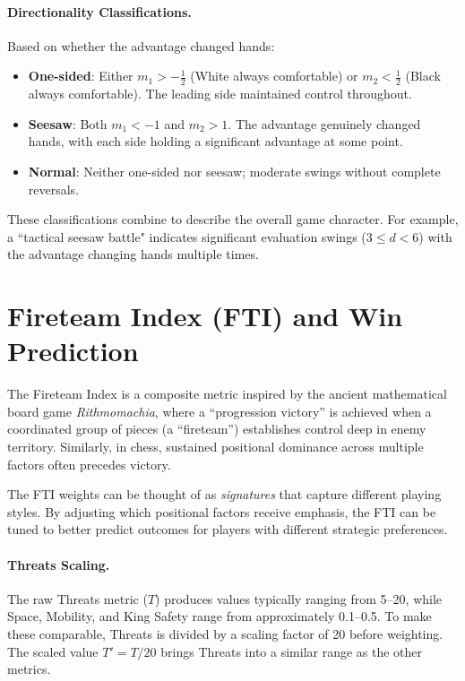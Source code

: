 \documentclass[11pt]{book}
\begin{document}
\paragraph{Directionality Classifications.} Based on whether the advantage changed hands:
\begin{itemize}
\item \textbf{One-sided}: Either $m_1 > -\frac{1}{2}$ (White always comfortable) or $m_2 < \frac{1}{2}$ (Black always comfortable). The leading side maintained control throughout.
\item \textbf{Seesaw}: Both $m_1 < -1$ and $m_2 > 1$. The advantage genuinely changed hands, with each side holding a significant advantage at some point.
\item \textbf{Normal}: Neither one-sided nor seesaw; moderate swings without complete reversals.
\end{itemize}

These classifications combine to describe the overall game character. For example, a ``tactical seesaw battle" indicates significant evaluation swings ($3 \le d < 6$) with the advantage changing hands multiple times.

\section{Fireteam Index (FTI) and Win Prediction}

The Fireteam Index is a composite metric inspired by the ancient mathematical board game \textit{Rithmomachia}, where a ``progression victory'' is achieved when a coordinated group of pieces (a ``fireteam'') establishes control deep in enemy territory. Similarly, in chess, sustained positional dominance across multiple factors often precedes victory.

The FTI weights can be thought of as \emph{signatures} that capture different playing styles. By adjusting which positional factors receive emphasis, the FTI can be tuned to better predict outcomes for players with different strategic preferences.

\paragraph{Threats Scaling.} The raw Threats metric ($T$) produces values typically ranging from 5--20, while Space, Mobility, and King Safety range from approximately 0.1--0.5. To make these comparable, Threats is divided by a scaling factor of 20 before weighting. The scaled value $T' = T/20$ brings Threats into a similar range as the other metrics.
\end{document}
